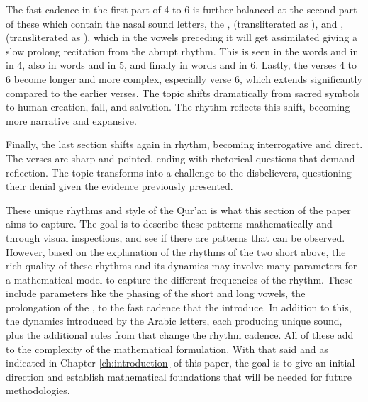 The fast cadence in the first part of   4 to 6 is further balanced at the second part of these   which contain the nasal sound letters, the  ,  (transliterated as ), and  ,  (transliterated as ), which in   the vowels preceding it will get assimilated giving a slow prolong recitation from the abrupt rhythm. This is seen in the words   and in   in   4, also in words   and   in   5, and finally in words   and   in   6. Lastly, the verses 4 to 6 become longer and more complex, especially verse 6, which extends significantly compared to the earlier verses. The topic shifts dramatically from sacred symbols to human creation, fall, and salvation. The rhythm reflects this shift, becoming more narrative and expansive.

Finally, the last section shifts again in rhythm, becoming interrogative and direct. The verses are sharp and pointed, ending with rhetorical questions that demand reflection. The topic transforms into a challenge to the disbelievers, questioning their denial given the evidence previously presented.

These unique rhythms and style of the Qur'\=an is what this section of the paper aims to capture. The goal is to describe these patterns mathematically and through visual inspections, and see if there are patterns that can be observed. However, based on the explanation of the rhythms of the two short   above, the rich quality of these rhythms and its dynamics may involve many parameters for a mathematical model to capture the different frequencies of the rhythm. These include parameters like the phasing of the short and long vowels, the prolongation of the  , to the fast cadence that the   introduce. In addition to this, the dynamics introduced by the Arabic letters, each producing unique sound, plus the additional rules from   that change the rhythm cadence. All of these add to the complexity of the mathematical formulation. With that said and as indicated in Chapter \ref{ch:introduction} of this paper, the goal is to give an initial direction and establish mathematical foundations that will be needed for future methodologies.

